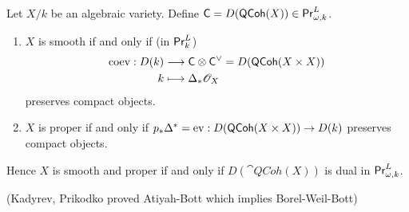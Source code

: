 \begin{theorem}[Kontsevich]
	Let $X /k$ be an algebraic variety. Define $\mathsf{C} = D(\mathsf{QCoh}(X))\in \mathsf{Pr}^L_{\omega,k}$.
\begin{enumerate}[1)]
	\item $X$ is smooth if and only if (in $\mathsf{Pr}^L_k$)
		\begin{align*}
			\operatorname{coev}: D(k) &\longrightarrow \mathsf{C}\otimes\mathsf{C}^{\vee} = D(\mathsf{QCoh}(X\times X)) \\
			k &\longmapsto \Delta_*\mathscr{O}_X
		\end{align*}
		preserves compact objects.
	\item $X$ is proper if and only if $p_*\Delta^{*}=\ev:D(\cat{QCoh}(X\times X))\to D(k)$
		preserves compact objects.
\end{enumerate}
Hence $X$ is smooth and proper if and only if $D(\cat{QCoh}(X))$ is dual in $\mathsf{Pr}^L_{\omega,k}$.
\end{theorem}
(Kadyrev, Prikodko proved Atiyah-Bott which implies Borel-Weil-Bott)


